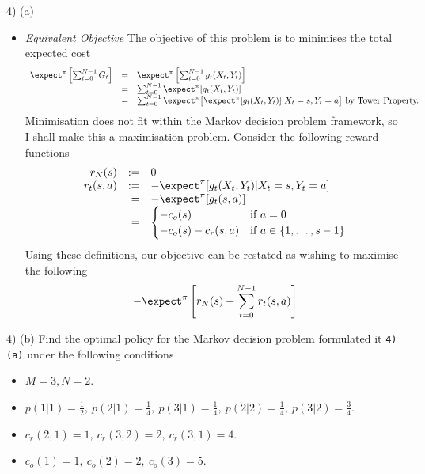 \documentclass[11pt,a4paper]{article}
\begin{document}
\begin{answer}{4) (a)}
\begin{itemize}
    \item \textit{Equivalent Objective}
    The objective of this problem is to minimises the total expected cost
    \[\begin{array}{rcl}
      \expect^\pi\left[\sum_{t=0}^{N-1}G_t\right]&=&\expect^\pi\left[\sum_{t=0}^{N-1}g_t(X_t,Y_t)\right]\\
      &=&\sum_{t=0}^{N-1}\expect^\pi[g_t(X_t,Y_t)]\\
      &=&\sum_{t=0}^{N-1}\expect^\pi\big[\expect^\pi[g_t(X_t,Y_t)]\big|X_t=s,Y_t=a\big]\text{ by Tower Property.}
    \end{array}\]
    Minimisation does not fit within the Markov decision problem framework, so I shall make this a maximisation problem. Consider the following reward functions
    \[\begin{array}{rrl}
      r_N(s)&:=&0\\
      r_t(s,a)&:=&-\expect^\pi[g_t(X_t,Y_t)|X_t=s,Y_t=a]\\
      &=&-\expect^\pi[g_t(s,a)]\\
      &=&\begin{cases}
              -c_o(s)&\text{if }a=0\\
              -c_o(s)-c_r(s,a)&\text{if }a\in\{1,\dots,s-1\}
            \end{cases}
    \end{array}\]
    Using these definitions, our objective can be restated as wishing to maximise the following
    \[ -\expect^\pi\left[r_N(s)+\sum_{t=0}^{N-1}r_t(s,a)\right] \]
  \end{itemize}
\end{answer}

\begin{question}{4) (b)}
  Find the optimal policy for the Markov decision problem formulated it \texttt{4) (a)} under the following conditions
  \begin{itemize}
    \item $M=3,N=2$.
    \item $p(1|1)=\frac12,\ p(2|1)=\frac14,\ p(3|1)=\frac14,\ p(2|2)=\frac14,\ p(3|2)=\frac34$.
    \item $c_r(2,1)=1,\ c_r(3,2)=2,\ c_r(3,1)=4$.
    \item $c_o(1)=1,\ c_o(2)=2,\ c_o(3)=5$.
  \end{itemize}
\end{question}
\end{document}
